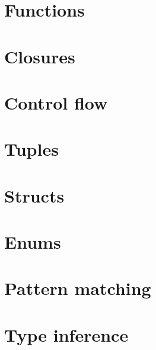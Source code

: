 \section{Functions}\label{section:reference:functions}
\section{Closures}\label{section:reference:closures}
\section{Control flow}\label{section:reference:control_flow}
\section{Tuples}\label{section:reference:tuples}
\section{Structs}\label{section:reference:structs}
\section{Enums}\label{section:reference:enums}
\section{Pattern matching}\label{section:reference:pattern_matching}
\section{Type inference}\label{section:reference:type_inference}
